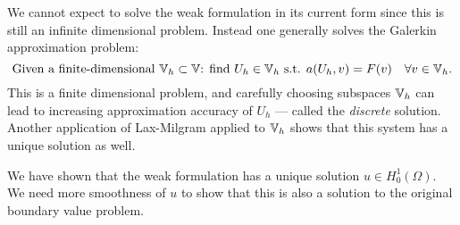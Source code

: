 \documentclass[thesis.tex]{subfiles}
\begin{document}
We cannot expect to solve the weak formulation in its current form since this is still an infinite dimensional problem.
Instead one generally solves the Galerkin approximation problem:
\begin{equation}
  \label{eq:galerk_finite}
  \text{Given a finite-dimensional } \mathbb{V}_h \subset \mathbb{V} \text{: find $U_h \in \mathbb{V}_h$ s.t. } a(U_h, v) = F(v) \quad \forall v \in \mathbb{V}_h.
\end{equation}
This is a finite dimensional problem, and carefully choosing subspaces $\mathbb{V}_h$ can lead to increasing approximation accuracy of $U_h$ --- 
called the \emph{discrete} solution. Another application of Lax-Milgram applied to $\mathbb{V}_h$ shows that this system has a unique solution as well.

\begin{rem}
  We have shown that the weak formulation has a unique solution $u \in H_0^1(\Omega)$. We need more smoothness of $u$ to show that this is also a solution to the original boundary value problem.
\end{rem}
\end{document}
